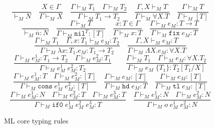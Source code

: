 \begin{figure}[p]
\label{mctr}
\caption{ML core typing rules}
\[
\frac{}{\vdash_{M}N}
\quad
\frac{X\in\Gamma}{\Gamma\vdash_{M}X}
\quad
\frac{\Gamma\vdash_{M}T_{1}\quad\Gamma\vdash_{M}T_{2}}{\Gamma\vdash_{M}T_{1}\rightarrow T_{2}}
\quad
\frac{\Gamma,X\vdash_{M}T}{\Gamma\vdash_{M}\forall X.T}
\quad
\frac{\Gamma\vdash_{M}T}{\Gamma\vdash_{M}[T]}
\]
\bigskip
\[
\frac{}{\vdash_{M}\overline{n}:N}
\quad
\frac{\Gamma\vdash_{M}T}{\Gamma\vdash_{M}\mathtt{nil}^{T}:[T]}
\quad
\frac{x:T\in\Gamma}{\Gamma\vdash_{M}x:T}
\quad
\frac{\Gamma\vdash_{M}e_{M}:T\rightarrow T}{\Gamma\vdash_{M}\mathtt{fix}\;e_{M}:T}
\]
\[
\frac{\Gamma\vdash_{M}T_{1}\quad\Gamma,x:T_{1}\vdash_{M}e_{M}:T_{2}}{\Gamma\vdash_{M}\lambda x:T_{1}.e_{M}:T_{1}\rightarrow T_{2}}
\quad
\frac{\Gamma,X\vdash_{M}e_{M}:T}{\Gamma\vdash_{M}\Lambda X.e_{M}:\forall X.T}
\]
\[
\frac{\Gamma\vdash_{M}e_{M}^{1}:T_{1}\rightarrow T_{2}\quad\Gamma\vdash_{M}e_{M}^{2}:T_{1}}{\Gamma\vdash_{M}e_{M}^{1}\;e_{M}^{2}:T_{2}}
\quad
\quad
\frac{\Gamma\vdash_{M}T_{1}\quad\Gamma\vdash_{M}e_{M}:\forall X.T_{2}}{\Gamma\vdash_{M}e_{M}\;\lbrace T_{1}\rbrace:T_{2}[T_{1}/X]}
\]
\[
\frac{\Gamma\vdash_{M}e_{M}^{1}:T\quad\Gamma\vdash_{M}e_{M}^{2}:[T]}{\Gamma\vdash_{M}\mathtt{cons}\;e_{M}^{1}\;e_{M}^{2}:[T]}
\quad
\frac{\Gamma\vdash_{M}e_{M}:[T]}{\Gamma\vdash_{M}\mathtt{hd}\;e_{M}:T}
\quad
\frac{\Gamma\vdash_{M}e_{M}:[T]}{\Gamma\vdash_{M}\mathtt{tl}\;e_{M}:[T]}
\]
\[
\frac{\Gamma\vdash_{M}e_{M}^{1}:N\quad\Gamma\vdash_{M}e_{M}^{2}:T\quad\Gamma\vdash_{M}e_{M}^{3}:T}{\Gamma\vdash_{M}\mathtt{if0}\;e_{M}^{1}\;e_{M}^{2}\;e_{M}^{3}:T}
\quad
\frac{\Gamma\vdash_{M}e_{M}^{1}:N\quad\Gamma\vdash_{M}e_{M}^{2}:N}{\Gamma\vdash_{M}o\;e_{M}^{1}\;e_{M}^{2}:N}
\]
\end{figure}
